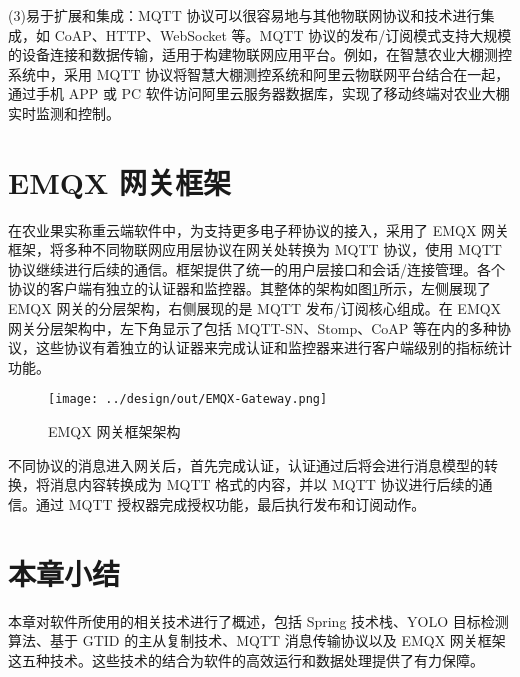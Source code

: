 


(3)易于扩展和集成：MQTT 协议可以很容易地与其他物联网协议和技术进行集成，如 CoAP、HTTP、WebSocket 等。MQTT 协议的发布/订阅模式支持大规模的设备连接和数据传输，适用于构建物联网应用平台。例如，在智慧农业大棚测控系统中，采用 MQTT 协议将智慧大棚测控系统和阿里云物联网平台结合在一起，通过手机 APP 或 PC 软件访问阿里云服务器数据库，实现了移动终端对农业大棚实时监测和控制\cite{Liang2020}。

\section{EMQX 网关框架}\label{sec:emqx}

在农业果实称重云端软件中，为支持更多电子秤协议的接入，采用了 EMQX 网关框架，将多种不同物联网应用层协议在网关处转换为 MQTT 协议，使用 MQTT 协议继续进行后续的通信。框架提供了统一的用户层接口和会话/连接管理。各个协议的客户端有独立的认证器和监控器\cite{EMQX-Gateway}。其整体的架构如图\ref{fig:EMQX-Gateway}所示，左侧展现了 EMQX 网关的分层架构，右侧展现的是 MQTT 发布/订阅核心组成。在 EMQX 网关分层架构中，左下角显示了包括 MQTT-SN、Stomp、CoAP 等在内的多种协议，这些协议有着独立的认证器来完成认证和监控器来进行客户端级别的指标统计功能。

\begin{figure}[H]
    \centering
    \texttt{[image: ../design/out/EMQX-Gateway.png]}
    \caption{EMQX 网关框架架构}
    \label{fig:EMQX-Gateway}
\end{figure}

不同协议的消息进入网关后，首先完成认证，认证通过后将会进行消息模型的转换，将消息内容转换成为 MQTT 格式的内容，并以 MQTT 协议进行后续的通信。通过 MQTT 授权器完成授权功能，最后执行发布和订阅动作。

\section{本章小结}

本章对软件所使用的相关技术进行了概述，包括 Spring 技术栈、YOLO 目标检测算法、基于 GTID 的主从复制技术、MQTT 消息传输协议以及 EMQX 网关框架这五种技术。这些技术的结合为软件的高效运行和数据处理提供了有力保障。
